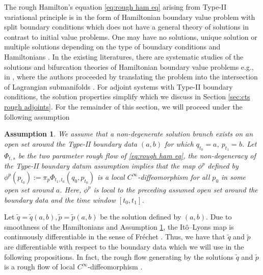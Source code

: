 \documentclass[11pt, oneside]{article}
\numberwithin{equation}{section}
\newtheorem{assumption}{Assumption}[section]
\theoremstyle{definition}
\newcommand{\wt}[1]{\widetilde{#1}}
\begin{document}
The rough Hamilton's equation \eqref{eq:rough ham eq} arising from Type-II variational principle is in the form of Hamiltonian boundary value problem with split boundary conditions which does not have a general theory of solutions in contrast to initial value problems. One may have no solutions, unique solution or multiple solutions depending on the type of boundary conditions and Hamiltonians \cite{Pontryagin2018}. In the existing literatures, there are systematic studies of the solutions and bifurcation theories of Hamiltonian boundary value problems e.g., in \cite{Eliashberg1998, MO2018}, where the authors proceeded by translating the problem into the intersection of Lagrangian submanifolds \cite{Weinstein1971, Weinstein1973}. For adjoint systems with Type-II boundary conditions, the solution properties simplify which we discuss in Section \ref{sec:cts rough adjoints}.
For the remainder of this section, we will proceed under the following assumption
\begin{assumption}\label{assump: non degen}
    We assume that a non-degenerate solution branch exists on an open set around the Type-II boundary data $(a,b)$ for which $q_{t_0} = a$, $p_{t_1} = b$. Let $\Phi_{t,s}$ be the two parameter rough flow of \eqref{eq:rough ham eq}, the non-degeneracy of the Type-II boundary datum assumption implies that the map $\phi^p$ defined by $\phi^p(p_{t_0}) := \pi_p \Phi_{t_1, t_0}(q_0, p_{t_0})$ is a local $C^\infty$-diffeomorphism for all $p_0$ in some open set around $a$. Here, $\phi^p$ is local to the preceding assumed open set around the boundary data and the time window $[t_0, t_1]$.
\end{assumption}
Let $\wt{q} = \wt{q}(a,b), \wt{p} = \wt{p}(a,b)$ be the solution defined by $(a,b)$. Due to smoothness of the Hamiltonians and Assumption \ref{assump: non degen}, the It\^o--Lyons map is continuously differentiable in the sense of Fr\'echet \cite[Thm. 11.6]{FV10}. Thus, we have that $\wt{q}$ and $\wt{p}$ are differentiable with respect to the boundary data which we will use in the following propositions. In fact, the rough flow generating by the solutions $\wt{q}$ and $\wt{p}$ is a rough flow of local $C^\infty$-diffeomorphism \cite[Thm. 11.14, 11.15]{FV10}.
\end{document}
